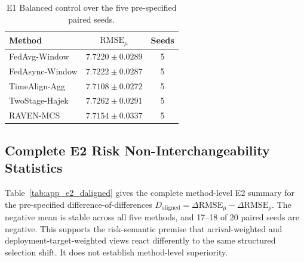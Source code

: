 \documentclass[letterpaper,journal]{IEEEtran}
\begin{document}
\begin{table}[htbp]
\centering
\caption{E1 Balanced control over the five pre-specified paired seeds.}
\label{tab:app_e1_balanced}
\footnotesize
\setlength{\tabcolsep}{5pt}
\begin{tabular}{lcc}
\toprule
Method & $\mathrm{RMSE}_\mu$ & Seeds\\
\midrule
FedAvg-Window & $7.7220\pm0.0289$ & 5 \\
FedAsync-Window & $7.7222\pm0.0287$ & 5 \\
TimeAlign-Agg & $7.7108\pm0.0272$ & 5 \\
TwoStage-Hajek & $7.7262\pm0.0291$ & 5 \\
RAVEN-MCS & $7.7154\pm0.0337$ & 5 \\
\bottomrule
\end{tabular}
\end{table}

\subsection{Complete E2 Risk Non-Interchangeability Statistics}
\label{app:e2_full_stats}

Table~\ref{tab:app_e2_daligned} gives the complete method-level E2 summary for
the pre-specified difference-of-differences
$D_{\mathrm{aligned}}=\Delta\mathrm{RMSE}_{\mu}
-\Delta\mathrm{RMSE}_{\rho}$.  The negative mean is stable across all five
methods, and 17--18 of 20 paired seeds are negative.  This supports the
risk-semantic premise that arrival-weighted and deployment-target-weighted
views react differently to the same structured selection shift.  It does not
establish method-level superiority.

\begin{table}[htbp]
\centering
\caption{E2 Complete-aligned risk non-interchangeability statistics.
CI denotes the 95\% interval; $p$ is the paired Wilcoxon test of
$D_{\mathrm{aligned}}$ against zero.}
\label{tab:app_e2_daligned}
\scriptsize
\setlength{\tabcolsep}{3.5pt}
\end{table}
\end{document}
